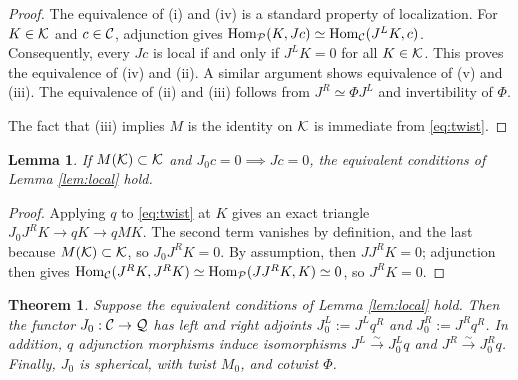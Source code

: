 \documentclass[12pt, letter]{amsart}
\newtheorem{lemma}[dummy]{Lemma}
\newtheorem{theorem}[dummy]{Theorem}
\theoremstyle{definition}
\begin{document}
\begin{proof}
The equivalence of (i) and (iv) is a standard property of localization.  
For \(K\in\mathcal{K}\) and \(c\in\mathcal{C}\), adjunction gives
$  \operatorname{Hom}_{\mathcal{P}}(K,Jc)\simeq\operatorname{Hom}_{\mathcal{C}}(J^L K,c)$.
Consequently, every \(Jc\) is local if and only if \(J^L K=0\) for all
\(K\in\mathcal{K}\). This proves the equivalence of (iv) and (ii).  A similar argument shows equivalence of (v) and (iii). 
The equivalence of (ii) and (iii) follows from
\(J^R\simeq\Phi J^L\) and invertibility of \(\Phi\).

The fact that (iii) implies $M$ is the identity on $\mathcal{K}$ is immediate from \eqref{eq:twist}. 
\end{proof}

\begin{lemma} \label{lem: categorical vcs criterion}
If $M(\mathcal{K}) \subset \mathcal{K}$ and $J_0 c = 0 \implies Jc = 0$, the equivalent conditions of Lemma \ref{lem:local} hold. 
\end{lemma}
\begin{proof}
Applying \(q\) to \eqref{eq:twist} at \(K\) gives an exact triangle $
  J_0 J^R K\longrightarrow qK\longrightarrow qMK. $
  The second term vanishes by definition, and the last because $M(\mathcal{K}) \subset \mathcal{K}$,  so \(J_0 J^R K=0\).
By assumption, then $JJ^RK=0$;
adjunction then gives
$\operatorname{Hom}_{\mathcal{C}}(J^RK,J^RK)\simeq\operatorname{Hom}_{\mathcal{P}}(JJ^RK,K)\simeq0$,
so $J^R K=0$.
\end{proof}



\begin{theorem}\label{thm: descending spherical functor}
Suppose  the equivalent conditions of Lemma \ref{lem:local} hold.
Then the functor \(J_0:\mathcal{C}\to\mathcal{Q}\) has left and right adjoints $J_0^L := J^L  q^R$ and $J_0^R := J^R q^R$.
In addition, $q$ adjunction morphisms induce isomorphisms $J^L \xrightarrow{\sim}  J_0^L q$ and $J^R \xrightarrow{\sim} J_0^R q$. 
Finally, $J_0$ is spherical, with
twist $M_0$, and cotwist $\Phi$.  \end{theorem}
\end{document}
